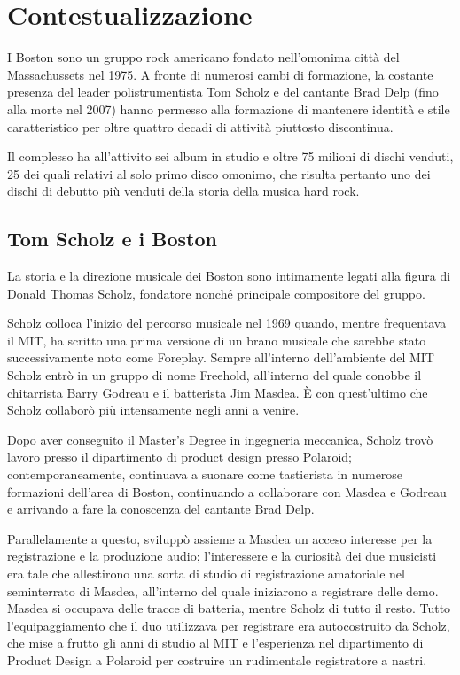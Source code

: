 \documentclass[class=book, crop=false, oneside, 12pt]{standalone}
\begin{document}
\chapter{Contestualizzazione}
I Boston sono un gruppo rock americano fondato nell'omonima città del Massachussets nel 1975. A fronte di numerosi cambi di formazione, la costante presenza del leader polistrumentista Tom Scholz e del cantante Brad Delp (fino alla morte nel 2007) hanno permesso alla formazione di mantenere identità e stile caratteristico per oltre quattro decadi di attività piuttosto discontinua. 

Il complesso ha all'attivito sei album in studio e oltre 75 milioni di dischi venduti, 25 dei quali relativi al solo primo disco omonimo, che risulta pertanto uno dei dischi di debutto più venduti della storia della musica hard rock. 

\section{Tom Scholz e i Boston}
La storia e la direzione musicale dei Boston sono intimamente legati alla figura di Donald Thomas Scholz, fondatore nonché principale compositore del gruppo.

Scholz colloca l'inizio del percorso musicale nel 1969 quando, mentre frequentava il MIT, ha scritto una prima versione di un brano musicale che sarebbe stato successivamente noto come Foreplay\cite{wiki:bost_b}. Sempre all'interno dell'ambiente del MIT Scholz entrò in un gruppo di nome Freehold, all'interno del quale conobbe il chitarrista Barry Godreau e il batterista Jim Masdea. È con quest'ultimo che Scholz collaborò più intensamente negli anni a venire.

Dopo aver conseguito il Master's Degree in ingegneria meccanica, Scholz trovò lavoro presso il dipartimento di product design presso Polaroid; contemporaneamente, continuava a suonare come tastierista in numerose formazioni dell'area di Boston, continuando a collaborare con Masdea e Godreau e arrivando a fare la conoscenza del cantante Brad Delp. 

Parallelamente a questo, sviluppò assieme a Masdea un acceso interesse per la registrazione e la produzione audio; l'interessere e la curiosità dei due musicisti era tale che allestirono una sorta di studio di registrazione amatoriale nel seminterrato di Masdea, all'interno del quale iniziarono a registrare delle demo. Masdea si occupava delle tracce di batteria, mentre Scholz di tutto il resto. Tutto l'equipaggiamento che il duo utilizzava per registrare era autocostruito da Scholz, che mise a frutto gli anni di studio al MIT e l'esperienza nel dipartimento di Product Design a Polaroid per costruire un rudimentale registratore a nastri. 
\end{document}

